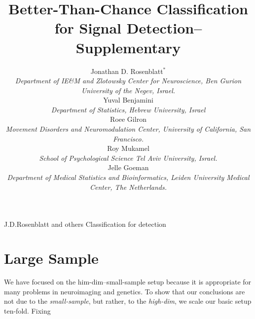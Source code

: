 \documentclass[]{bio}
\begin{document}
\title{Better-Than-Chance Classification for Signal Detection-- Supplementary}

\author{Jonathan D. Rosenblatt$^\ast$ \\ 
	\textit{Department of IE\&M and Zlotowsky Center for Neuroscience, 
		Ben Gurion University of the Negev, Israel.} 
	\\ Yuval Benjamini \\
	\textit{Department of Statistics, Hebrew University, Israel}	
	\\ Roee Gilron \\ 
	\textit{Movement Disorders and Neuromodulation Center, University of California, San Francisco.}
	\\ Roy Mukamel \\ 
	\textit{School of Psychological Science Tel Aviv University, Israel.}
	\\ Jelle Goeman \\ 
	\textit{Department of Medical Statistics and Bioinformatics, Leiden University Medical Center, The Netherlands.}
}


\markboth%
{J.D.Rosenblatt and others}
{Classification for detection}

\maketitle



\section{Large Sample}

We have focused on the him-dim--small-sample setup because it is appropriate for many problems in neuroimaging and genetics. 
To show that our conclusions are not due to the \emph{small-sample}, but rather, to the \emph{high-dim}, we scale our basic setup ten-fold. 
Fixing 
\end{document}
